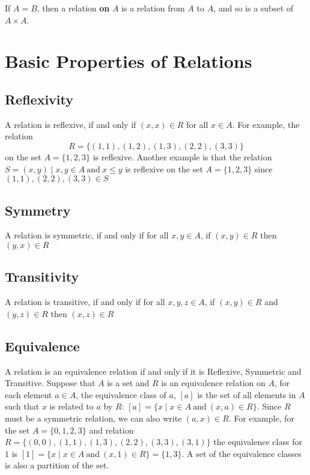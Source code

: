 If $A = B$, then a relation \textbf{on} $A$ is a relation from $A$ to $A$, and so is a subset of $A \times A$.

\section*{Basic Properties of Relations}

\subsection*{Reflexivity}

A relation is reflexive, if and only if $(x, x) \in R$ for all $x \in A$. For example, the relation
 \[R = \{(1, 1), (1, 2), (1, 3), (2, 2), (3, 3)\}\] on the set $A = \{1, 2, 3\}$ is reflexive. Another example is that the
 relation $S = {(x, y) \mid x, y \in A \mathrm{\ and\ } x \leq y}$ is reflexive on the set $A = \{1, 2, 3\}$ since
 $(1, 1), (2, 2), (3, 3) \in S$

\subsection*{Symmetry}

A relation is symmetric, if and only if for all $x, y \in A$, if $(x, y) \in R$ then $(y, x) \in R$

\subsection*{Transitivity}

A relation is transitive, if and only if for all $x, y, z \in A$, if $(x, y) \in R$ and $(y, z) \in R$ then
 $(x, z) \in R$

\subsection*{Equivalence}

A relation is an equivalence relation if and only if it is Reflexive, Symmetric and Transitive. Suppose that $A$ is a
 set and $R$ is an equivalence relation on $A$, for each element $a \in A$, the equivalence class of $a$, $[a]$ is the
 set of all elements in $A$ such that $x$ is related to $a$ by $R$: $[a] = \{x \mid x \in A \mathrm{\ and\ } (x, a) \in R\}$.
 Since $R$ must be a symmetric relation, we can also write $(a, x) \in R$. For example, for the set $A = \{0, 1, 2, 3\}$
 and relation $R = \{(0, 0), (1, 1), (1, 3), (2, 2), (3, 3), (3, 1)\}$ the equivalence class for $1$ is
 $[1] = \{x \mid x \in A \mathrm{\ and\ } (x, 1) \in R\} = \{1, 3\}$. A set of the equivalence classes is also a partition
 of the set.